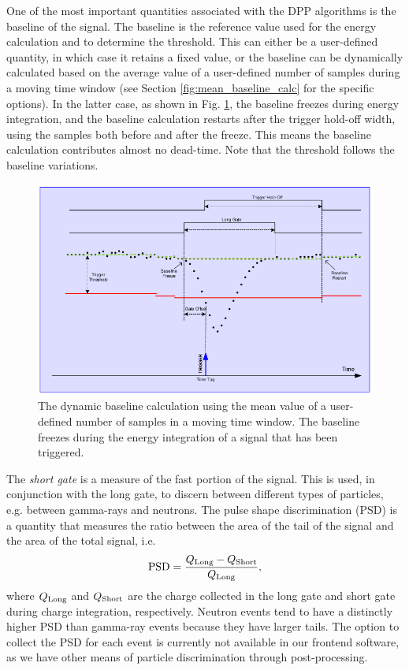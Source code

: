 One of the most important quantities associated with the DPP algorithms is the baseline of the signal. The baseline is the reference value used for the energy calculation and to determine the threshold. This can either be a user-defined quantity, in which case it retains a fixed value, or the baseline can be dynamically calculated based on the average value of a user-defined number of samples during a moving time window (see Section \ref{fig:mean_baseline_calc} for the specific options). In the latter case, as shown in Fig. \ref{fig:baseline_calc}, the baseline freezes during energy integration, and the baseline calculation restarts after the trigger hold-off width, using the samples both before and after the freeze. This means the baseline calculation contributes almost no dead-time. Note that the threshold follows the baseline variations.

\begin{figure}[t]
\centering
\includegraphics[width=6.5in]{Chapter-5/figs/baseline.png}
\caption{\label{fig:baseline_calc}The dynamic baseline calculation using the mean value of a user-defined number of samples in a moving time window. The baseline freezes during the energy integration of a signal that has been triggered.}
\end{figure}

The \emph{short gate} is a measure of the fast portion of the signal. This is used, in conjunction with the long gate, to discern between different types of particles, e.g. between gamma-rays and neutrons. The pulse shape discrimination (PSD) is a quantity that measures the ratio between the area of the tail of the signal and the area of the total signal, i.e.
\begin{equation*}
\textnormal{PSD} = \frac{Q_{\textnormal{Long}} - Q_{\textnormal{Short}}}{Q_{\textnormal{Long}}},
\end{equation*}
where $Q_{\textnormal{Long}}$ and $Q_{\textnormal{Short}}$ are the charge collected in the long gate and short gate during charge integration, respectively. Neutron events tend to have a distinctly higher PSD than gamma-ray events because they have larger tails. The option to collect the PSD for each event is currently not available in our frontend software, as we have other means of particle discrimination through post-processing.

